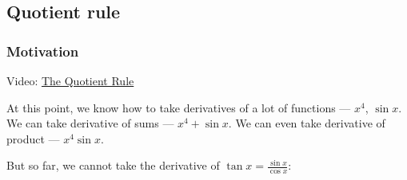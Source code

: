 \documentclass[pdftex, brazil, 12pt, twoside]{article}
\begin{document}
\subsection{Quotient rule}
\label{u2-quotient-rule}

\subsubsection{Motivation}
\label{u2-quotient-rule-motivation}

Video: \href{https://www.youtube.com/watch?v=n70KPd7LjUU}{The Quotient Rule}

At this point, we know how to take
derivatives of a lot of functions --- $x^4$,
$\sin{x}$.
We can take derivative of sums --- $x^4 + \sin{x}$.
We can even take derivative of product --- $x^4 \sin{x}$.

\begin{figure}[H]
  \begin{center}
  \end{center}
\end{figure}

But so far, we cannot take the derivative of $\displaystyle \tan{x} = \frac{\sin{x}}{\cos{x}}$:
\end{document}
